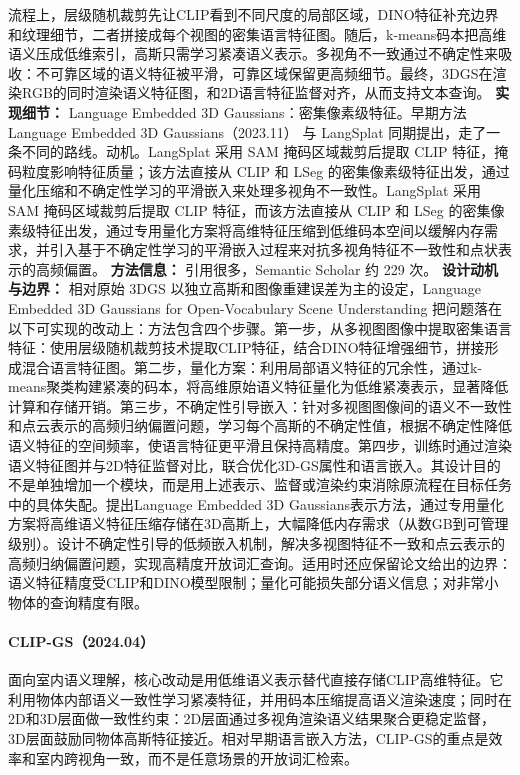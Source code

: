 流程上，层级随机裁剪先让CLIP看到不同尺度的局部区域，DINO特征补充边界和纹理细节，二者拼接成每个视图的密集语言特征图。随后，k-means码本把高维语义压成低维索引，高斯只需学习紧凑语义表示。多视角不一致通过不确定性来吸收：不可靠区域的语义特征被平滑，可靠区域保留更高频细节。最终，3DGS在渲染RGB的同时渲染语义特征图，和2D语言特征监督对齐，从而支持文本查询。
\textbf{实现细节：} Language Embedded 3D Gaussians：密集像素级特征。早期方法 Language Embedded 3D Gaussians（2023.11） 与 LangSplat 同期提出，走了一条不同的路线。动机。LangSplat 采用 SAM 掩码区域裁剪后提取 CLIP 特征，掩码粒度影响特征质量；该方法直接从 CLIP 和 LSeg 的密集像素级特征出发，通过量化压缩和不确定性学习的平滑嵌入来处理多视角不一致性。LangSplat 采用 SAM 掩码区域裁剪后提取 CLIP 特征，而该方法直接从 CLIP 和 LSeg 的密集像素级特征出发，通过专用量化方案将高维特征压缩到低维码本空间以缓解内存需求，并引入基于不确定性学习的平滑嵌入过程来对抗多视角特征不一致性和点状表示的高频偏置。
\textbf{方法信息：} 引用很多，Semantic Scholar 约 229 次。
\textbf{设计动机与边界：} 相对原始 3DGS 以独立高斯和图像重建误差为主的设定，Language Embedded 3D Gaussians for Open-Vocabulary Scene Understanding 把问题落在以下可实现的改动上：方法包含四个步骤。第一步，从多视图图像中提取密集语言特征：使用层级随机裁剪技术提取CLIP特征，结合DINO特征增强细节，拼接形成混合语言特征图。第二步，量化方案：利用局部语义特征的冗余性，通过k-means聚类构建紧凑的码本，将高维原始语义特征量化为低维紧凑表示，显著降低计算和存储开销。第三步，不确定性引导嵌入：针对多视图图像间的语义不一致性和点云表示的高频归纳偏置问题，学习每个高斯的不确定性值，根据不确定性降低语义特征的空间频率，使语言特征更平滑且保持高精度。第四步，训练时通过渲染语义特征图并与2D特征监督对比，联合优化3D-GS属性和语言嵌入。其设计目的不是单独增加一个模块，而是用上述表示、监督或渲染约束消除原流程在目标任务中的具体失配。提出Language Embedded 3D Gaussians表示方法，通过专用量化方案将高维语义特征压缩存储在3D高斯上，大幅降低内存需求（从数GB到可管理级别）。设计不确定性引导的低频嵌入机制，解决多视图特征不一致和点云表示的高频归纳偏置问题，实现高精度开放词汇查询。适用时还应保留论文给出的边界：语义特征精度受CLIP和DINO模型限制；量化可能损失部分语义信息；对非常小物体的查询精度有限。
\paragraph{CLIP-GS（2024.04）\cite{2404_14249}}
面向室内语义理解，核心改动是用低维语义表示替代直接存储CLIP高维特征。它利用物体内部语义一致性学习紧凑特征，并用码本压缩提高语义渲染速度；同时在2D和3D层面做一致性约束：2D层面通过多视角渲染语义结果聚合更稳定监督，3D层面鼓励同物体高斯特征接近。相对早期语言嵌入方法，CLIP-GS的重点是效率和室内跨视角一致，而不是任意场景的开放词汇检索。


